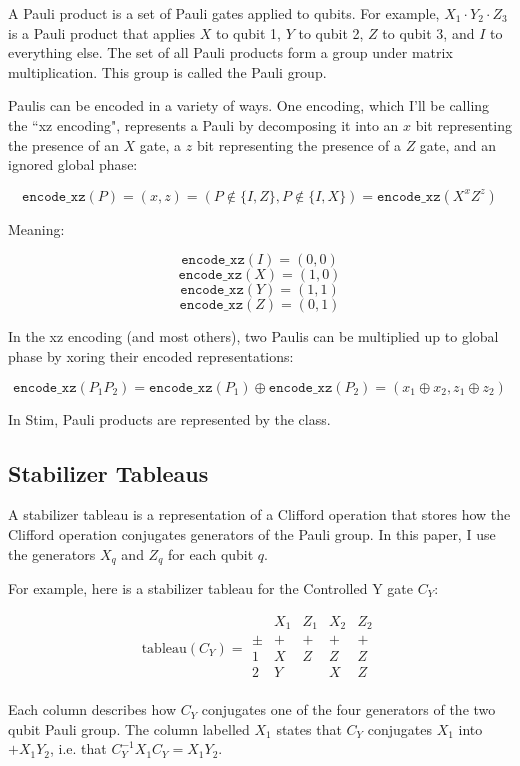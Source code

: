 \documentclass[onecolumn,unpublished]{quantumarticle}
\theoremstyle{definition}
\theoremstyle{definition}
\theoremstyle{definition}
\begin{document}
A Pauli product is a set of Pauli gates applied to qubits.
For example, $X_1 \cdot Y_2 \cdot Z_3$ is a Pauli product that applies $X$ to qubit 1, $Y$ to qubit 2, $Z$ to qubit 3, and $I$ to everything else.
The set of all Pauli products form a group under matrix multiplication.
This group is called the Pauli group.

Paulis can be encoded in a variety of ways.
One encoding, which I'll be calling the ``xz encoding", represents a Pauli by decomposing it into an $x$ bit representing the presence of an $X$ gate, a $z$ bit representing the presence of a $Z$ gate, and an ignored global phase:

$$\texttt{encode\_xz}(P) = (x, z) = (P \notin \{I, Z\}, P \notin \{I, X\}) = \texttt{encode\_xz}(X^x Z^z)$$

Meaning:

$$\texttt{encode\_xz}(I) = (0, 0)$$
$$\texttt{encode\_xz}(X) = (1, 0)$$
$$\texttt{encode\_xz}(Y) = (1, 1)$$
$$\texttt{encode\_xz}(Z) = (0, 1)$$

In the xz encoding (and most others), two Paulis can be multiplied up to global phase by xoring their encoded representations:

$$\texttt{encode\_xz}(P_1 P_2) = \texttt{encode\_xz}(P_1) \oplus \texttt{encode\_xz}(P_2) = (x_1 \oplus x_2, z_1 \oplus z_2)$$

In Stim, Pauli products are represented by the  class.

\subsection{Stabilizer Tableaus}

A stabilizer tableau is a representation of a Clifford operation that stores how the Clifford operation conjugates generators of the Pauli group.
In this paper, I use the generators $X_q$ and $Z_q$ for each qubit $q$.

For example, here is a stabilizer tableau for the Controlled Y gate $C_Y$:

$$
\text{tableau}(C_Y) = \begin{array}{r|cc|cc}
    & X_1 & Z_1 & X_2 & Z_2   \\
    \hline
    \pm & + & + & + & + \\
    1 & X & Z & Z & Z \\
    2 & Y &   & X & Z \\
\end{array}
$$

Each column describes how $C_Y$ conjugates one of the four generators of the two qubit Pauli group.
The column labelled $X_1$ states that $C_Y$ conjugates $X_1$ into $+X_1 Y_2$, i.e. that $C_Y^{-1} X_1 C_Y = X_1 Y_2$.
\end{document}
